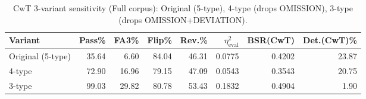 \begin{table}[htbp]
\centering
\caption{CwT 3-variant sensitivity (Full corpus): Original (5-type), 4-type (drops OMISSION), 3-type (drops OMISSION+DEVIATION).}
\label{tab:cwt_3variants_full}
\begin{tabular}{lrrrrrrr}
\toprule
Variant & Pass\% & FA3\% & Flip\% & Rev.\% & $\eta^2_{\text{eval}}$ & BSR(CwT) & Det.(CwT)\% \\
\midrule
  Original (5-type) & 35.64 & 6.60 & 84.04 & 46.31 & 0.0775 & 0.4202 & 23.87 \\
  4-type & 72.90 & 16.96 & 79.15 & 47.09 & 0.0543 & 0.3543 & 20.75 \\
  3-type & 99.03 & 29.82 & 80.78 & 53.43 & 0.1832 & 0.4904 & 1.90 \\
\bottomrule
\end{tabular}
\end{table}
